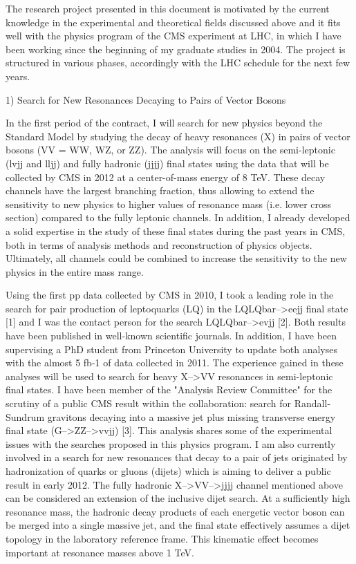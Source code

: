 \documentclass[10pt, a4paper]{article}
\begin{document}
The research project presented in this document is motivated by the current knowledge in the experimental and theoretical fields discussed above and it fits well with the physics program of the CMS experiment at LHC, in which I have been working since the beginning of my graduate studies in 2004. The project is structured in various phases, accordingly with the LHC schedule for the next few years.

1) Search for New Resonances Decaying to Pairs of Vector Bosons

In the first period of the contract, I will search for new physics beyond the Standard Model by studying the decay of heavy resonances (X) in pairs of vector bosons (VV = WW, WZ, or ZZ). The analysis will focus on the semi-leptonic (lvjj and lljj) and fully hadronic (jjjj) final states using the data that will be collected by CMS in 2012 at a center-of-mass energy of 8 TeV.  These decay channels have the largest branching fraction, thus allowing to extend the sensitivity to new physics to higher values of resonance mass (i.e. lower cross section) compared to the fully leptonic channels. In addition, I already developed a solid expertise in the study of these final states during the past years in CMS, both in terms of analysis methods and reconstruction of physics objects. Ultimately, all channels could be combined to increase the sensitivity to the new physics in the entire mass range.

Using the first pp data collected by CMS in 2010, I took a leading role in the search for pair production of leptoquarks (LQ) in the LQLQbar-->eejj final state [1] and I was the contact person for the search LQLQbar-->evjj [2]. Both results have been published in well-known scientific journals. In addition, I have been supervising a PhD student from Princeton University to update both analyses with the almost 5 fb-1 of data collected in 2011. The experience gained in these analyses will be used to search for heavy X-->VV resonances in semi-leptonic final states. 
I have been member of the "Analysis Review Committee" for the scrutiny of a public CMS result within the collaboration: search for Randall-Sundrum gravitons decaying into a massive jet plus missing transverse energy final state (G-->ZZ-->vvjj) [3]. This analysis shares some of the experimental issues with the searches proposed in this physics program.  
I am also currently involved in a search for new resonances that decay to a pair  of jets originated by hadronization of quarks or gluons (dijets) which is aiming to deliver a public result in early 2012. The fully hadronic X-->VV-->jjjj channel mentioned above can be considered an extension of the inclusive dijet search. At a sufficiently high resonance mass, the hadronic decay products of each energetic vector boson can be merged into a single massive jet, and the final state effectively assumes a dijet topology in the laboratory reference frame. This kinematic effect becomes important at resonance masses above 1 TeV.
\end{document}
